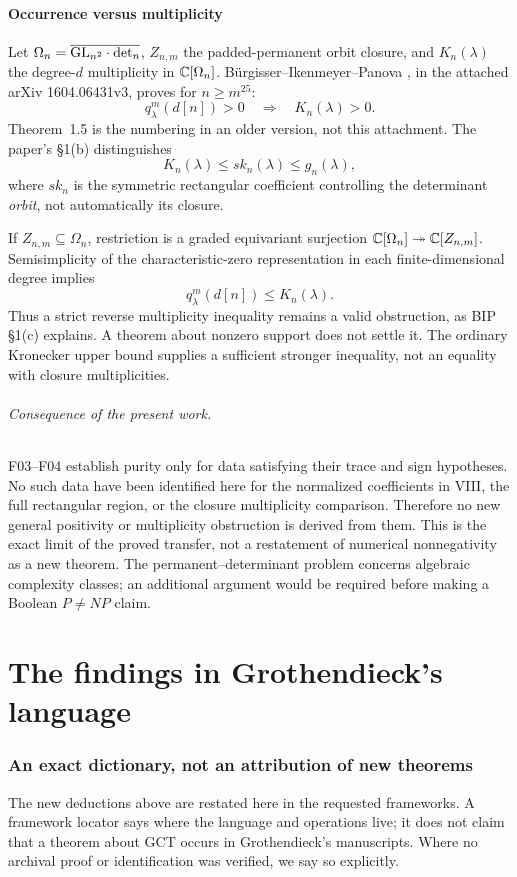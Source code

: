 \documentclass[11pt,a4paper]{article}
\newcommand{\fid}[1]{\textsf{#1}}\newcommand{\gate}[1]{\textsf{#1}}
\theoremstyle{named}\newtheorem{finding}{Finding}[section]
\theoremstyle{definition}\newtheorem{definition}[finding]{Definition}
\theoremstyle{remark}\newtheorem{remark}[finding]{Remark}
\begin{document}
\subsection{Occurrence versus multiplicity}
Let $\Omega_n=\overline{\mathrm{GL}_{n^2}\cdot\det_n}$, $Z_{n,m}$ the padded-permanent orbit closure, and $K_n(\lambda)$ the degree-$d$ multiplicity in $\mathbb C[\Omega_n]$. B\"urgisser--Ikenmeyer--Panova \cite[Theorem 1.4]{BIP}, in the attached arXiv 1604.06431v3, proves for $n\ge m^{25}$:
\[
 q^m_\lambda(d[n])>0\quad\Longrightarrow\quad K_n(\lambda)>0.
\]
Theorem~1.5 is the numbering in an older version, not this attachment. The paper's \S1(b) distinguishes
\[
 K_n(\lambda)\le sk_n(\lambda)\le g_n(\lambda),
\]
where $sk_n$ is the symmetric rectangular coefficient controlling the determinant \emph{orbit}, not automatically its closure.

If $Z_{n,m}\subseteq\Omega_n$, restriction is a graded equivariant surjection
$\mathbb C[\Omega_n]\twoheadrightarrow\mathbb C[Z_{n,m}]$. Semisimplicity of the characteristic-zero representation in each finite-dimensional degree implies
\[
 q^m_\lambda(d[n])\le K_n(\lambda).
\]
Thus a strict reverse multiplicity inequality remains a valid obstruction, as BIP \S1(c) explains. A theorem about nonzero support does not settle it. The ordinary Kronecker upper bound supplies a sufficient stronger inequality, not an equality with closure multiplicities.

\paragraph{Consequence of the present work.}
\fid{F03}--\fid{F04} establish purity only for data satisfying their trace and sign hypotheses. No such data have been identified here for the normalized coefficients in VIII, the full rectangular region, or the closure multiplicity comparison. Therefore no new general positivity or multiplicity obstruction is derived from them. This is the exact limit of the proved transfer, not a restatement of numerical nonnegativity as a new theorem. The permanent--determinant problem concerns algebraic complexity classes; an additional argument would be required before making a Boolean $P\ne NP$ claim.

\part{The findings in Grothendieck's language}
\section{An exact dictionary, not an attribution of new theorems}\label{sec:groth}
The new deductions above are restated here in the requested frameworks. A framework locator says where the language and operations live; it does not claim that a theorem about GCT occurs in Grothendieck's manuscripts. Where no archival proof or identification was verified, we say so explicitly.
\end{document}
